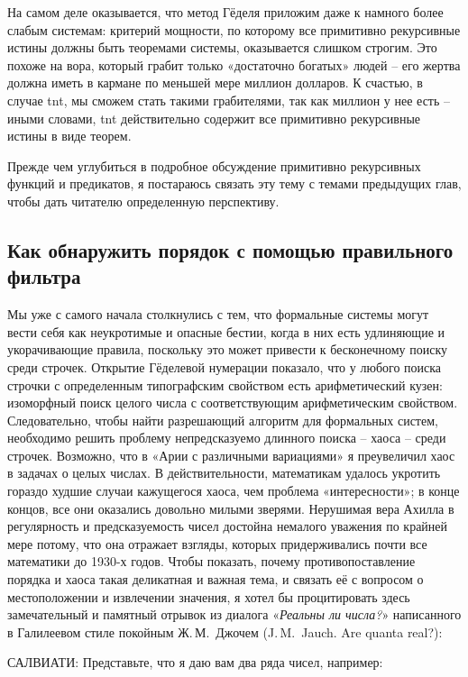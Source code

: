 \documentclass[../main.tex]{subfiles}
\begin{document}
На самом деле оказывается, что метод Гёделя приложим даже к намного более слабым системам: критерий мощности, по которому все примитивно рекурсивные истины должны быть теоремами системы, оказывается слишком строгим. Это похоже на вора, который грабит только «достаточно богатых» людей \--- его жертва должна иметь в кармане по меньшей мере миллион долларов. К счастью, в случае \acs{tnt}, мы сможем стать такими грабителями, так как миллион у нее есть \--- иными словами, \acs{tnt} действительно содержит все примитивно рекурсивные истины в виде теорем.

Прежде чем углубиться в подробное обсуждение примитивно рекурсивных функций и предикатов, я постараюсь связать эту тему с темами предыдущих глав, чтобы дать читателю определенную перспективу.


\subsection{Как обнаружить порядок с помощью правильного фильтра}

Мы уже с самого начала столкнулись с тем, что формальные системы могут вести себя как неукротимые и опасные бестии, когда в них есть удлиняющие и укорачивающие правила, поскольку это может привести к бесконечному поиску среди строчек. Открытие Гёделевой нумерации показало, что у любого поиска строчки с определенным типографским свойством есть арифметический кузен: изоморфный поиск целого числа с соответствующим арифметическим свойством. Следовательно, чтобы найти разрешающий алгоритм для формальных систем, необходимо решить проблему непредсказуемо длинного поиска \--- хаоса \--- среди строчек. Возможно, что в «Арии с различными вариациями» я преувеличил хаос в задачах о целых числах. В действительности, математикам удалось укротить гораздо худшие случаи кажущегося хаоса, чем проблема «интересности»; в конце концов, все они оказались довольно милыми зверями. Нерушимая вера Ахилла в регулярность и предсказуемость чисел достойна немалого уважения по крайней мере потому, что она отражает взгляды, которых придерживались почти все математики до 1930-х годов. Чтобы показать, почему противопоставление порядка и хаоса такая деликатная и важная тема, и связать её с вопросом о местоположении и извлечении значения, я хотел бы процитировать здесь замечательный и памятный отрывок из диалога «\emph{Реальны ли числа?}» написанного в Галилеевом стиле покойным Ж.\,М.~Джочем (J.\,M.~Jauch. Are quanta real?):

САЛВИАТИ: Представьте, что я даю вам два ряда чисел, например:
\end{document}
